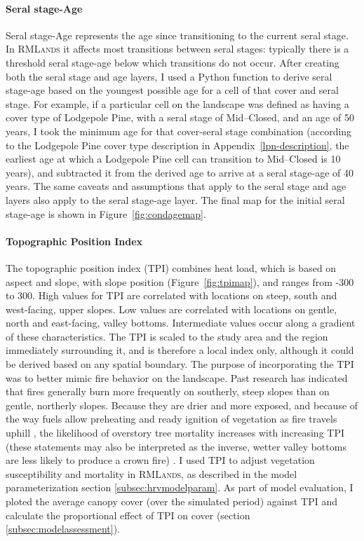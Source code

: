 \paragraph{Seral stage-Age}
Seral stage-Age represents the age since transitioning to the current seral stage. In \textsc{RMLands} it affects most transitions between seral stages: typically there is a threshold seral stage-age below which transitions do not occur. After creating both the seral stage and age layers, I used a Python function to derive seral stage-age based on the youngest possible age for a cell of that cover and seral stage. For example, if a particular cell on the landscape was defined as having a cover type of Lodgepole Pine, with a seral stage of Mid--Closed, and an age of 50 years, I took the minimum age for that cover-seral stage combination (according to the Lodgepole Pine cover type description in Appendix~\ref{lpn-description}, the earliest age at which a Lodgepole Pine cell can transition to Mid--Closed is 10 years), and subtracted it from the derived age to arrive at a seral stage-age of 40 years. The same caveats and assumptions that apply to the seral stage and age layers also apply to the seral stage-age layer. The final map for the initial seral stage-age is shown in Figure~\ref{fig:condagemap}.


\paragraph{Topographic Position Index}
The topographic position index (TPI) combines heat load, which is based on aspect and slope, with slope position (Figure~\ref{fig:tpimap}), and ranges from -300 to 300. High values for TPI are correlated with locations on steep, south and west-facing, upper slopes. Low values are correlated with locations on gentle, north and east-facing, valley bottoms. Intermediate values occur along a gradient of these characteristics. The TPI is scaled to the study area and the region immediately surrounding it, and is therefore a local index only, although it could be derived based on any spatial boundary. The purpose of incorporating the TPI was to better mimic fire behavior on the landscape. Past research has indicated that fires generally burn more frequently on southerly, steep slopes than on gentle, northerly slopes. Because they are drier and more exposed, and because of the way fuels allow preheating and ready ignition of vegetation as fire travels uphill \citep{Rothermel1983}, the likelihood of overstory tree mortality increases with increasing TPI (these statements may also be interpreted as the inverse, wetter valley bottoms are less likely to produce a crown fire) \citep{North2012,Taylor2003a}. I used TPI to adjust vegetation susceptibility and mortality in \textsc{RMLands}, as described in the model parameterization section \ref{subsec:hrvmodelparam}. As part of model evaluation, I ploted the average canopy cover (over the simulated period) against TPI and calculate the proportional effect of TPI on cover (section \ref{subsec:modelassessment}).




